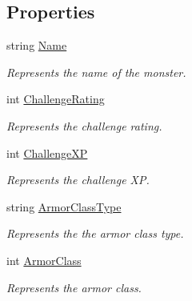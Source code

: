 \subsection*{Properties}
\begin{DoxyCompactItemize}
\item 
string \mbox{\hyperlink{class_dungeons__n___dragons___manager_1_1_models_1_1_monster_a59755bb08e625de50c94edcb23d4884c}{Name}}
\begin{DoxyCompactList}\small\item\em Represents the name of the monster. \end{DoxyCompactList}\item 
int \mbox{\hyperlink{class_dungeons__n___dragons___manager_1_1_models_1_1_monster_ae29eef336f8109b334423e15b86afd45}{Challenge\+Rating}}
\begin{DoxyCompactList}\small\item\em Represents the challenge rating. \end{DoxyCompactList}\item 
int \mbox{\hyperlink{class_dungeons__n___dragons___manager_1_1_models_1_1_monster_af85fae46c1fcc8b6b47e2b2ee2568efd}{Challenge\+XP}}
\begin{DoxyCompactList}\small\item\em Represents the challenge XP. \end{DoxyCompactList}\item 
string \mbox{\hyperlink{class_dungeons__n___dragons___manager_1_1_models_1_1_monster_aefe8c2ef47368286dbf580177edef248}{Armor\+Class\+Type}}
\begin{DoxyCompactList}\small\item\em Represents the the armor class type. \end{DoxyCompactList}\item 
int \mbox{\hyperlink{class_dungeons__n___dragons___manager_1_1_models_1_1_monster_af64ce927601cdfb96b8cf082e90a8467}{Armor\+Class}}
\begin{DoxyCompactList}\small\item\em Represents the armor class. \end{DoxyCompactList}\item 

\end{DoxyCompactItemize}
